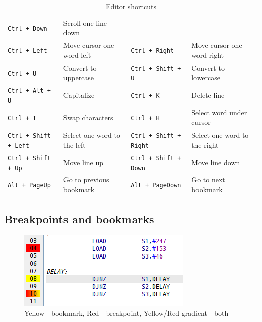 \begin{table}[h!]
{\begin{tabular}{|ll|ll|}
                        \texttt{Ctrl + Down}                & Scroll one line down          \\
                        \texttt{Ctrl + Left}                & Move cursor one word left     &
                        \texttt{Ctrl + Right}               & Move cursor one word right    \\
                        \texttt{Ctrl + U}                   & Convert to uppercase          &
                        \texttt{Ctrl + Shift + U}           & Convert to lowercase          \\
                        \texttt{Ctrl + Alt + U}             & Capitalize                    &
                        \texttt{Ctrl + K}                   & Delete line                   \\
                        \texttt{Ctrl + T}                   & Swap characters               &
                        \texttt{Ctrl + H}                   & Select word under cursor      \\
                        \texttt{Ctrl + Shift + Left}        & Select one word to the left   &
                        \texttt{Ctrl + Shift + Right}       & Select one word to the right  \\
                        \texttt{Ctrl + Shift + Up}          & Move line up                  &
                        \texttt{Ctrl + Shift + Down}        & Move line down                \\
                        \texttt{Alt + PageUp}               & Go to previous bookmark       &
                        \texttt{Alt + PageDown}             & Go to next bookmark           \\
                        \hline
                \end{tabular}
            }
            \caption{Editor shortcuts}
        \end{table}

    \clearpage
    \subsection{Breakpoints and bookmarks}
         
        \begin{figure}
            \centering
                \includegraphics[width=.35\textwidth]{img/breakpoints1.png}
                \caption{Yellow - bookmark, Red - breakpoint, Yellow/Red gradient - both}
        \end{figure}

